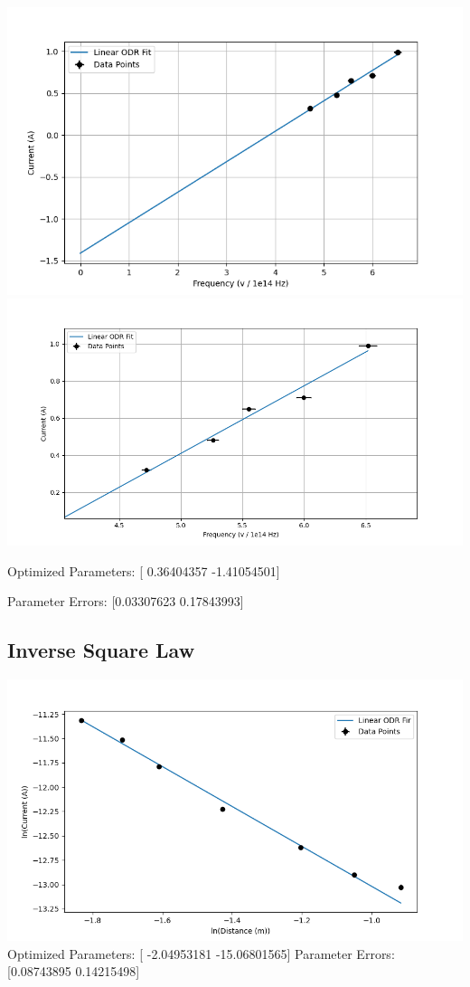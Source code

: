 \documentclass[%
 sor,
 jor,
 amsmath,amssymb,
 reprint,%
]{revtex4-2}
\begin{document}
\includegraphics[scale=0.69]{image1}\\
\includegraphics[scale=0.69]{image 2}

Optimized Parameters: [ 0.36404357 -1.41054501]

Parameter Errors: [0.03307623 0.17843993]




\subsection{Inverse Square Law}
\includegraphics[scale=0.69]{image}
Optimized Parameters: [ -2.04953181 -15.06801565]
Parameter Errors: [0.08743895 0.14215498]
\end{document}
